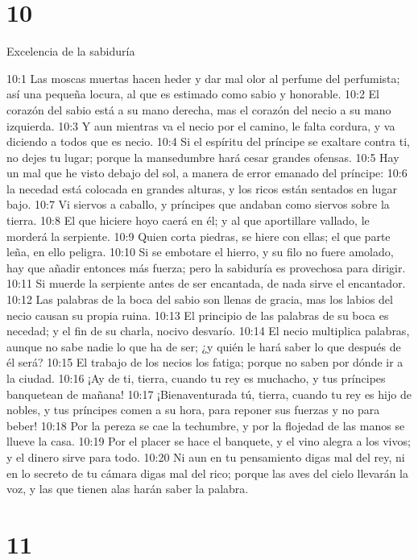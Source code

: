 \chapter{10}

Excelencia de la sabiduría  

10:1 Las moscas muertas hacen heder y dar mal olor al perfume del perfumista; así una pequeña locura, al que es estimado como sabio y honorable.  
10:2 El corazón del sabio está a su mano derecha, mas el corazón del necio a su mano izquierda.  
10:3 Y aun mientras va el necio por el camino, le falta cordura, y va diciendo a todos que es necio.  
10:4 Si el espíritu del príncipe se exaltare contra ti, no dejes tu lugar; porque la mansedumbre hará cesar grandes ofensas.  
10:5 Hay un mal que he visto debajo del sol, a manera de error emanado del príncipe:  
10:6 la necedad está colocada en grandes alturas, y los ricos están sentados en lugar bajo.  
10:7 Vi siervos a caballo, y príncipes que andaban como siervos sobre la tierra.  
10:8 El que hiciere hoyo caerá en él; y al que aportillare vallado, le morderá la serpiente.  
10:9 Quien corta piedras, se hiere con ellas; el que parte leña, en ello peligra.  
10:10 Si se embotare el hierro, y su filo no fuere amolado, hay que añadir entonces más fuerza; pero la sabiduría es provechosa para dirigir.  
10:11 Si muerde la serpiente antes de ser encantada, de nada sirve el encantador.  
10:12 Las palabras de la boca del sabio son llenas de gracia, mas los labios del necio causan su propia ruina.  
10:13 El principio de las palabras de su boca es necedad; y el fin de su charla, nocivo desvarío. 
10:14 El necio multiplica palabras, aunque no sabe nadie lo que ha de ser; ¿y quién le hará saber lo que después de él será?  
10:15 El trabajo de los necios los fatiga; porque no saben por dónde ir a la ciudad.  
10:16 ¡Ay de ti, tierra, cuando tu rey es muchacho, y tus príncipes banquetean de mañana!  
10:17 ¡Bienaventurada tú, tierra, cuando tu rey es hijo de nobles, y tus príncipes comen a su hora, para reponer sus fuerzas y no para beber!  
10:18 Por la pereza se cae la techumbre, y por la flojedad de las manos se llueve la casa.  
10:19 Por el placer se hace el banquete, y el vino alegra a los vivos; y el dinero sirve para todo.  
10:20 Ni aun en tu pensamiento digas mal del rey, ni en lo secreto de tu cámara digas mal del rico; porque las aves del cielo llevarán la voz, y las que tienen alas harán saber la palabra.  

\chapter{11}


